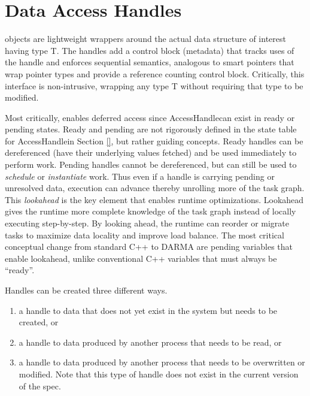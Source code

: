 \newcommand{\ahandle}{AccessHandle}
\newcommand{\ahandleT}{AccessHandle<T>}
\newcommand{\cwork}{\inlinecode{create_work}}

\section{Data Access Handles}
\label{sec:handles}
 objects are lightweight wrappers around the actual data structure of interest having type T. 
The handles add a control block (metadata) that tracks uses of the handle and enforces
\gls{sequential semantics}, analogous to smart pointers that wrap pointer types and provide a reference counting control block.
Critically, this interface is non-intrusive, wrapping any type T without requiring that type to be modified.

Most critically,  enables deferred access since \ahandle can exist in ready or pending states. 
Ready and pending are not rigorously defined in the state table for \ahandle in Section \ref{}, but rather guiding concepts.
Ready handles can be dereferenced (have their underlying values fetched) and be used immediately to perform work.
Pending handles cannot be dereferenced, but can still be used to \emph{schedule} or \emph{instantiate} work.
Thus even if a handle is carrying pending or unresolved data, execution can advance thereby unrolling more of the task graph.
This \emph{lookahead} is the key element that enables runtime optimizations.
Lookahead gives the runtime more complete knowledge of the task graph instead of locally executing step-by-step.
By looking ahead, the runtime can reorder or migrate tasks to maximize data locality and improve load balance.
The most critical conceptual change from standard C++ to DARMA are pending variables that enable lookahead, unlike conventional C++ variables that must always be ``ready''.


Handles can be created three different ways.
\begin{enumerate}
\item a handle to data that does not yet exist in the system
but needs to be created, or
\item a handle to data produced by another process that needs to
be read, or 
\item a handle to data produced by another process that needs to be overwritten or modified. 
Note that this type of handle does not exist in the current version of the spec.
\end{enumerate}


